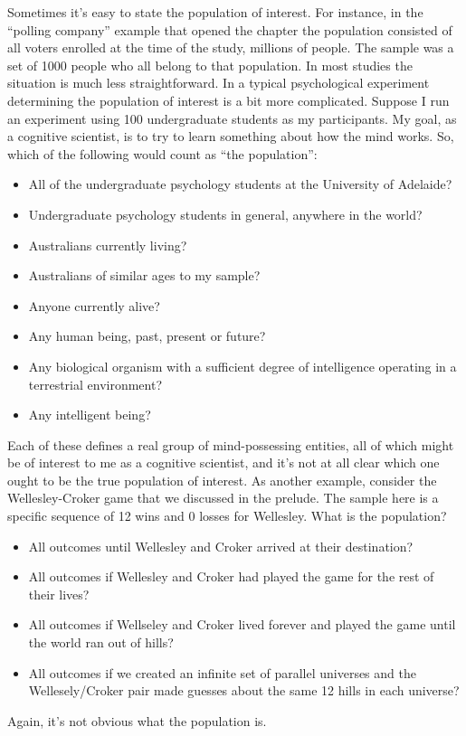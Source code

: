 Sometimes it's easy to state the population of interest. For instance, in the ``polling company'' example that opened the chapter the population consisted of all voters enrolled at the time of the study, millions of people. The sample was a set of 1000 people who all belong to that population. In most studies the situation is much less straightforward. In a typical psychological experiment determining the population of interest is a bit more complicated. Suppose I run an experiment using 100 undergraduate students as my participants. My goal, as a cognitive scientist, is to try to learn something about how the mind works. So, which of the following would count as ``the population'':
\begin{itemize} \itemsep -2pt
\item All of the undergraduate psychology students at the University of Adelaide?
\item Undergraduate psychology students in general, anywhere in the world?
\item Australians currently living?
\item Australians of similar ages to my sample?
\item Anyone currently alive?
\item Any human being, past, present or future?
\item Any biological organism with a sufficient degree of intelligence operating in a terrestrial environment?
\item Any intelligent being?
\end{itemize}
Each of these defines a real group of mind-possessing entities, all of which might be of interest to me as a cognitive scientist, and it's not at all clear which one ought to be the true population of interest. As another example, consider the Wellesley-Croker game that we discussed in the prelude. The sample here is a specific sequence of 12 wins and 0 losses for Wellesley. What is the population?
\begin{itemize} \itemsep -2pt
\item All outcomes until Wellesley and Croker arrived at their destination?
\item All outcomes if Wellesley and Croker had played the game for the rest of their lives?
\item All outcomes if Wellseley and Croker lived forever and played the game until the world ran out of hills?
\item All outcomes if we created an infinite set of parallel universes and the Wellesely/Croker pair made guesses about the same 12 hills in each universe?
\end{itemize}
Again, it's not obvious what the population is.

